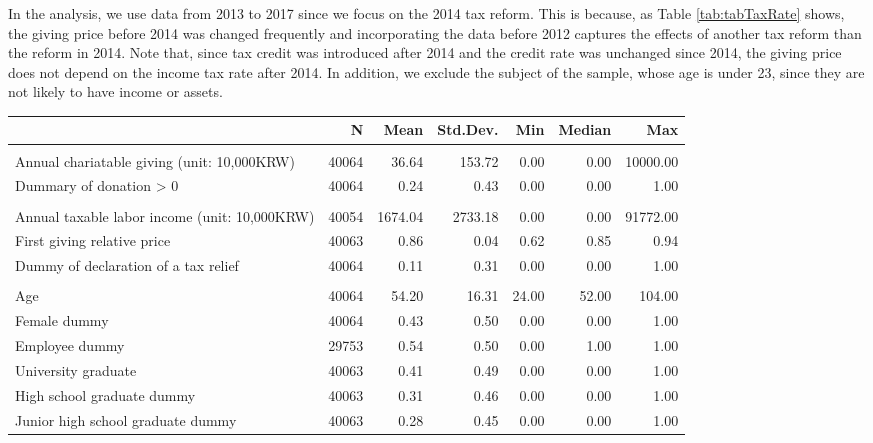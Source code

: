 \documentclass[
  11pt,
  a4paper,
]{article}
\begin{document}
In the analysis,
we use data from 2013 to 2017 since we focus on the 2014 tax reform.
This is because, as Table \ref{tab:tabTaxRate} shows,
the giving price before 2014 was changed frequently
and incorporating the data before 2012
captures the effects of another tax reform than the reform in 2014.
Note that, since tax credit was introduced after 2014 and
the credit rate was unchanged since 2014,
the giving price does not depend on the income tax rate after 2014.
In addition, we exclude the subject of the sample, whose age is under 23,
since they are not likely to have income or assets.

\begin{table}
\centering
\begin{tabular}[t]{lrrrrrr}
\toprule
  & N & Mean & Std.Dev. & Min & Median & Max\\
\midrule
\addlinespace[0.3em]
\multicolumn{7}{l}{\textbf{Charitable Donations}}\\
\hspace{1em}Annual chariatable giving (unit: 10,000KRW) & 40064 & 36.64 & 153.72 & 0.00 & 0.00 & 10000.00\\
\hspace{1em}Dummary of donation > 0 & 40064 & 0.24 & 0.43 & 0.00 & 0.00 & 1.00\\
\addlinespace[0.3em]
\multicolumn{7}{l}{\textbf{Income, giving price, and tax report}}\\
\hspace{1em}Annual taxable labor income (unit: 10,000KRW) & 40054 & 1674.04 & 2733.18 & 0.00 & 0.00 & 91772.00\\
\hspace{1em}First giving relative price & 40063 & 0.86 & 0.04 & 0.62 & 0.85 & 0.94\\
\hspace{1em}Dummy of declaration of a tax relief & 40064 & 0.11 & 0.31 & 0.00 & 0.00 & 1.00\\
\addlinespace[0.3em]
\multicolumn{7}{l}{\textbf{Individual Characteristics}}\\
\hspace{1em}Age & 40064 & 54.20 & 16.31 & 24.00 & 52.00 & 104.00\\
\hspace{1em}Female dummy & 40064 & 0.43 & 0.50 & 0.00 & 0.00 & 1.00\\
\hspace{1em}Employee dummy & 29753 & 0.54 & 0.50 & 0.00 & 1.00 & 1.00\\
\hspace{1em}University graduate & 40063 & 0.41 & 0.49 & 0.00 & 0.00 & 1.00\\
\hspace{1em}High school graduate dummy & 40063 & 0.31 & 0.46 & 0.00 & 0.00 & 1.00\\
\hspace{1em}Junior high school graduate dummy & 40063 & 0.28 & 0.45 & 0.00 & 0.00 & 1.00\\
\bottomrule
\end{tabular}
\end{table}
\end{document}
